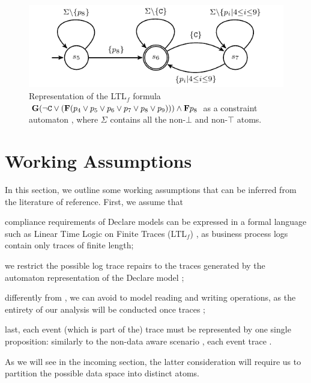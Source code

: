 \begin{figure}[!t]
	\centering
%
\includegraphics[scale=0.7]{images/example_3_graph}
	\caption{Representation of the LTL$_f$ formula $\mathbf{G}(\neg\texttt{C}\vee(\mathbf{F}(p_4\vee p_5\vee p_6\vee p_7\vee p_8\vee p_9)))\wedge \mathbf{F} p_8$  as a constraint automaton \cite{Westergaard11}, where $\Sigma$ contains all the non-$\bot$ and non-$\top$ atoms.}
	\label{fig:g1g2}
\end{figure}

\section{Working Assumptions}\label{sec:wa}

In this section, we outline some working assumptions that can be inferred from the literature of reference. First, we assume that \begin{enumerate*}[label=\emph{\alph*})]
\item compliance requirements of Declare models can be expressed in a formal language such as Linear Time Logic on Finite Traces (LTL$_f$) \cite{GiacomoV13}, as business process logs contain only traces of finite length;
\item we restrict the possible log trace repairs to the traces generated by the automaton representation of the Declare model \cite{XuLZ17a};
\item differently from \cite{MaggiMB19,MultiPerspective}, we can avoid to model reading and writing operations, as the entirety of our analysis will be conducted once traces ; \item last, each event (which is part of the) trace must be represented by one single proposition: similarly to the non-data aware scenario \cite{XuLZ17a}, each event trace . \end{enumerate*} As we will see in the incoming section, the latter consideration will require us to partition the possible data space into distinct atoms.


